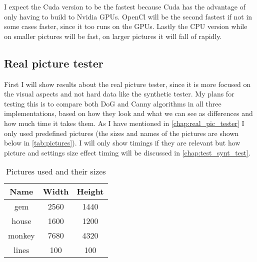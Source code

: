 I expect the Cuda version to be the fastest because Cuda has the advantage of only having to build to Nvidia \ac{GPU}s. OpenCl will be the second fastest if not in some cases faster, since it too runs on the \ac{GPU}s. Lastly the \ac{CPU} version while on smaller pictures will be fast, on larger pictures it will fall of rapidly.

\begin{table}[H]
\centering
{}
\caption{Specifications of the machines used in testing}
\label{tab:machine}
\end{table}

\subsection{Real picture tester}
\label{chap:reason}

First I will show results about the real picture tester, since it is more focused on the visual aspects and not hard data like the synthetic tester. My plans for testing this is to compare both \ac{DoG} and \ac{Canny} algorithms in all three implementations, based on how they look and what we can see as differences and how much time it takes them. As I have mentioned in \autoref{chap:real_pic_tester} I only used predefined pictures (the sizes and names of the pictures are shown below in \autoref{tab:pictures}). I will only show timings if they are relevant but how picture and settings size effect timing will be discussed in \autoref{chap:test_synt_test}.

\begin{table}[H]
\centering
\begin{tabular}{| c | c | c |}
\hline
Name & Width & Height \\
\hline \hline	
gem & 2560 & 1440 \\
\hline
house & 1600 & 1200 \\
\hline
monkey & 7680 & 4320 \\
\hline
lines & 100 & 100 \\
\hline
\end{tabular}
\caption{Pictures used and their sizes}
\label{tab:pictures}
\end{table}

